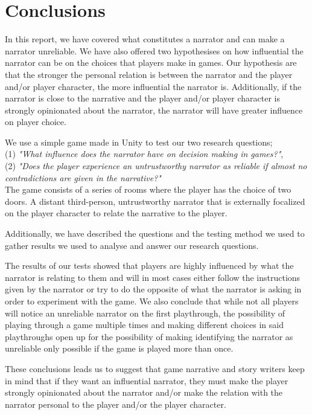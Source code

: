 \section{Conclusions}
In this report, we have covered what constitutes a narrator and can make a narrator unreliable. We have also offered two hypothesises on how influential the narrator can be on the choices that players make in games. Our hypothesis are that the stronger the personal relation is between the narrator and the player and/or player character, the more influential the narrator is. Additionally, if the narrator is close to the narrative and the player and/or player character is strongly opinionated about the narrator, the narrator will have greater influence on player choice.

We use a simple game made in Unity to test our two research questions; 
\\(1) \textit{"What influence does the narrator have on decision making in games?"}, 
\\(2) \textit{"Does the player experience an untrustworthy narrator as reliable if almost no contradictions are given in the narrative?"}
\\The game consists of a series of rooms where the player has the choice of two doors. A distant third-person, untrustworthy narrator that is externally focalized on the player character to relate the narrative to the player.

Additionally, we have described the questions and the testing method we used to gather results we used to analyse and answer our research questions.

The results of our tests showed that players are highly influenced by what the narrator is relating to them and will in most cases either follow the instructions given by the narrator or try to do the opposite of what the narrator is asking in order to experiment with the game. We also conclude that while not all players will notice an unreliable narrator on the first playthrough, the possibility of playing through a game multiple times and making different choices in said playthroughs open up for the possibility of making identifying the narrator as unreliable only possible if the game is played more than once.

These conclusions leads us to suggest that game narrative and story writers keep in mind that if they want an influential narrator, they must make the player strongly opinionated about the narrator and/or make the relation with the narrator personal to the player and/or the player character.

